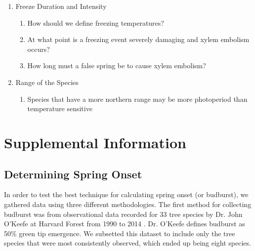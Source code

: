 \documentclass{article}\usepackage[]{graphicx}\usepackage[]{color}
\begin{document}
\begin{siderules}
\begin{enumerate}
\begin{enumerate}
  \end{enumerate}
  \item Freeze Duration and Intensity
  \begin{enumerate}
    \item How should we define freezing temperatures?
    \item At what point is a freezing event severely damaging and xylem embolism occurs?
    \item How long must a false spring be to cause xylem embolism?
  \end{enumerate}
  \item Range of the Species
  \begin{enumerate}
    \item Species that have a more northern range may be more photoperiod than temperature sensitive 
  \end{enumerate}
\end{enumerate}
\end{siderules}



\section*{Supplemental Information}
\subsection*{Determining Spring Onset}
In order to test the best technique for calculating spring onset (or budburst), we gathered data using three different methodologies. The first method for collecting budburst was from observational data recorded for 33 tree species by Dr. John O'Keefe at Harvard Forest from 1990 to 2014 \citep{OKeefe2014}. 
Dr. O'Keefe defines budburst as 50\% green tip emergence. We subsetted this dataset to include only the tree species that were most consistently observed, which ended up being eight species.
\end{document}
